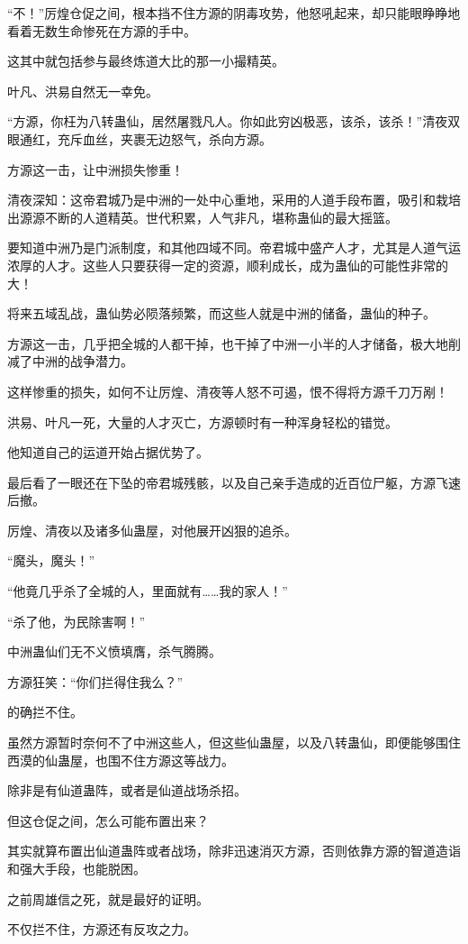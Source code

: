 \begin{this_body}
“不！”厉煌仓促之间，根本挡不住方源的阴毒攻势，他怒吼起来，却只能眼睁睁地看着无数生命惨死在方源的手中。

这其中就包括参与最终炼道大比的那一小撮精英。

叶凡、洪易自然无一幸免。

“方源，你枉为八转蛊仙，居然屠戮凡人。你如此穷凶极恶，该杀，该杀！”清夜双眼通红，充斥血丝，夹裹无边怒气，杀向方源。

方源这一击，让中洲损失惨重！

清夜深知：这帝君城乃是中洲的一处中心重地，采用的人道手段布置，吸引和栽培出源源不断的人道精英。世代积累，人气非凡，堪称蛊仙的最大摇篮。

要知道中洲乃是门派制度，和其他四域不同。帝君城中盛产人才，尤其是人道气运浓厚的人才。这些人只要获得一定的资源，顺利成长，成为蛊仙的可能性非常的大！

将来五域乱战，蛊仙势必陨落频繁，而这些人就是中洲的储备，蛊仙的种子。

方源这一击，几乎把全城的人都干掉，也干掉了中洲一小半的人才储备，极大地削减了中洲的战争潜力。

这样惨重的损失，如何不让厉煌、清夜等人怒不可遏，恨不得将方源千刀万剐！

洪易、叶凡一死，大量的人才灭亡，方源顿时有一种浑身轻松的错觉。

他知道自己的运道开始占据优势了。

最后看了一眼还在下坠的帝君城残骸，以及自己亲手造成的近百位尸躯，方源飞速后撤。

厉煌、清夜以及诸多仙蛊屋，对他展开凶狠的追杀。

“魔头，魔头！”

“他竟几乎杀了全城的人，里面就有……我的家人！”

“杀了他，为民除害啊！”

中洲蛊仙们无不义愤填膺，杀气腾腾。

方源狂笑：“你们拦得住我么？”

的确拦不住。

虽然方源暂时奈何不了中洲这些人，但这些仙蛊屋，以及八转蛊仙，即便能够围住西漠的仙蛊屋，也围不住方源这等战力。

除非是有仙道蛊阵，或者是仙道战场杀招。

但这仓促之间，怎么可能布置出来？

其实就算布置出仙道蛊阵或者战场，除非迅速消灭方源，否则依靠方源的智道造诣和强大手段，也能脱困。

之前周雄信之死，就是最好的证明。

不仅拦不住，方源还有反攻之力。


\end{this_body}
